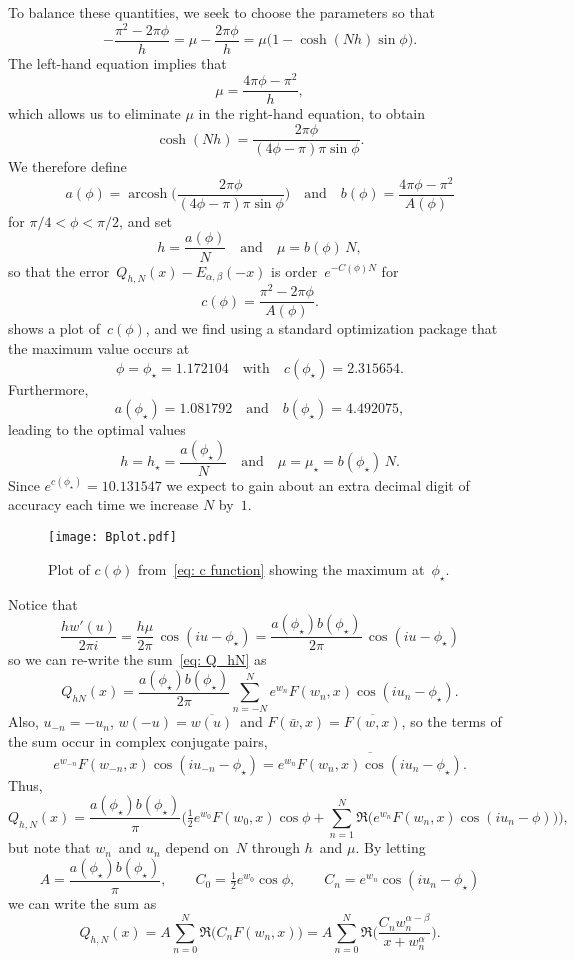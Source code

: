\documentclass[12pt,a4paper]{article}
\newcommand{\arcosh}{\operatorname{arcosh}}
\begin{document}
To balance these quantities, we seek to choose the parameters so that
\cite[(4.2)]{WeidemanTrefethen2007}
\[
-\frac{\pi^2-2\pi\phi}{h}=\mu-\frac{2\pi\phi}{h}
    =\mu\bigl(1-\cosh(Nh)\sin\phi\bigr).
\]
The left-hand equation implies that
\[
\mu=\frac{4\pi\phi-\pi^2}{h},
\]
which allows us to eliminate $\mu$ in the right-hand equation, to obtain
\[
\cosh(Nh)=\frac{2\pi\phi}{(4\phi-\pi)\pi\sin\phi}.
\]
We therefore define
\[
a(\phi)=\arcosh\biggl(\frac{2\pi\phi}{(4\phi-\pi)\pi\sin\phi}\biggr)
\quad\text{and}\quad b(\phi)=\frac{4\pi\phi-\pi^2}{A(\phi)}
\]
for $\pi/4<\phi<\pi/2$, and set
\[
h=\frac{a(\phi)}{N}\quad\text{and}\quad \mu=b(\phi)\,N,
\]
so that the error~$Q_{h,N}(x)-E_{\alpha,\beta}(-x)$ is order~$e^{-C(\phi)N}$ 
for
\begin{equation}\label{eq: c function}
c(\phi)=\frac{\pi^2-2\pi\phi}{A(\phi)}.
\end{equation}
 shows a plot of~$c(\phi)$, and we find using a standard 
optimization package that the maximum value occurs at
\[
\phi=\phi_\star=1.172104\quad\text{with}\quad c(\phi_\star)=2.315654.
\]
Furthermore,
\[
a(\phi_\star)=1.081792\quad\text{and}\quad
b(\phi_\star)=4.492075,
\]
leading to the optimal values 
\[
h=h_\star=\frac{a(\phi_\star)}{N}\quad\text{and}\quad
\mu=\mu_\star=b(\phi_\star)\,N.
\]
Since $e^{c(\phi_\star)}=10.131547$ we expect to gain about an extra decimal
digit of accuracy each time we increase $N$ by~$1$.

\begin{figure}
\caption{Plot of $c(\phi)$ from~\eqref{eq: c function} showing the 
maximum at~$\phi_\star$.}\label{fig: c plot}
\begin{center}
\texttt{[image: Bplot.pdf]}
\end{center}
\end{figure}

Notice that
\[
\frac{hw'(u)}{2\pi i}=\frac{h\mu}{2\pi}\,\cos(iu-\phi_\star)
    =\frac{a(\phi_\star)b(\phi_\star)}{2\pi}\,\cos(iu-\phi_\star)
\]
so we can re-write the sum~\eqref{eq: Q_hN} as
\[
Q_{hN}(x)=\frac{a(\phi_\star)b(\phi_\star)}{2\pi}\sum_{n=-N}^N
    e^{w_n}F(w_n,x)\cos(iu_n-\phi_\star).
\]
Also, $u_{-n}=-u_n$, $w(-u)=\overline{w(u)}$~and 
$F(\bar w,x)=\overline{F(w,x)}$, so the terms of the sum occur in complex 
conjugate pairs,
\[
e^{w_{-n}}F(w_{-n},x)\cos(iu_{-n}-\phi_\star)
    =\overline{e^{w_n}F(w_n,x)\cos(iu_n-\phi_\star)}.
\]
Thus,
\[
Q_{h,N}(x)=\frac{a(\phi_\star)b(\phi_\star)}{\pi}\biggl(
    \tfrac12e^{w_0}F(w_0,x)\cos\phi
    +\sum_{n=1}^N\Re\bigl(e^{w_n}F(w_n,x)\cos(iu_n-\phi)\bigr)\biggr),
\]
but note that $w_n$~and $u_n$ depend on~$N$ through $h$~and $\mu$.  By letting
\[
A=\frac{a(\phi_\star)b(\phi_\star)}{\pi},\qquad
C_0=\tfrac12e^{w_0}\cos\phi,\qquad
C_n=e^{w_n}\cos(iu_n-\phi_\star)
\]
we can write the sum as
\[
Q_{h,N}(x)=A\sum_{n=0}^N\Re\bigl(C_nF(w_n,x)\bigr)
    =A\sum_{n=0}^N\Re\biggl(\frac{C_nw_n^{\alpha-\beta}}{x+w_n^\alpha}\biggr).
\]
\end{document}
